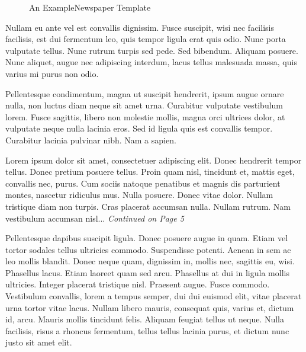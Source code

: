 \documentclass{article}
\date{2000 3 2}
\begin{document}
\maketitle

\begin{figure*}[h]
  \begin{center}
    \fontsize{40}{1.5cm}\selectfont
    An ExampleNewspaper Template
    \hfill
    \end{center}
\end{figure*}


\begin{multicols}{3}{



\begin{window}
  Nullam eu ante vel est convallis dignissim.  Fusce suscipit, wisi
  nec facilisis facilisis, est dui fermentum leo, quis tempor ligula
  erat quis odio.  Nunc porta vulputate tellus.  Nunc rutrum turpis
  sed pede.  Sed bibendum.  Aliquam posuere.  Nunc aliquet, augue nec
  adipiscing interdum, lacus tellus malesuada massa, quis varius mi
  purus non odio.

  Pellentesque condimentum, magna ut suscipit hendrerit, ipsum augue
  ornare nulla, non luctus diam neque sit amet urna.  Curabitur
  vulputate vestibulum lorem.  Fusce sagittis, libero non molestie
  mollis, magna orci ultrices dolor, at vulputate neque nulla lacinia
  eros.  Sed id ligula quis est convallis tempor.  Curabitur lacinia
  pulvinar nibh.  Nam a sapien.
\end{window}
\par



Lorem ipsum dolor sit amet, consectetuer adipiscing elit.  Donec
hendrerit tempor tellus.  Donec pretium posuere tellus.  Proin quam
nisl, tincidunt et, mattis eget, convallis nec, purus.  Cum sociis
natoque penatibus et magnis dis parturient montes, nascetur ridiculus
mus.  Nulla posuere.  Donec vitae dolor.  Nullam tristique diam non
turpis.  Cras placerat accumsan nulla.  Nullam rutrum.  Nam vestibulum
accumsan nisl... \emph{Continued on Page 5}

\closearticle



Pellentesque dapibus suscipit ligula.  Donec posuere augue in quam.
Etiam vel tortor sodales tellus ultricies commodo.  Suspendisse
potenti.  Aenean in sem ac leo mollis blandit.  Donec neque quam,
dignissim in, mollis nec, sagittis eu, wisi.  Phasellus lacus.  Etiam
laoreet quam sed arcu.  Phasellus at dui in ligula mollis ultricies.
Integer placerat tristique nisl.  Praesent augue.  Fusce commodo.
Vestibulum convallis, lorem a tempus semper, dui dui euismod elit,
vitae placerat urna tortor vitae lacus.  Nullam libero mauris,
consequat quis, varius et, dictum id, arcu.  Mauris mollis tincidunt
felis.  Aliquam feugiat tellus ut neque.  Nulla facilisis, risus a
rhoncus fermentum, tellus tellus lacinia purus, et dictum nunc justo
sit amet elit.

}
\end{multicols}
\end{document}
